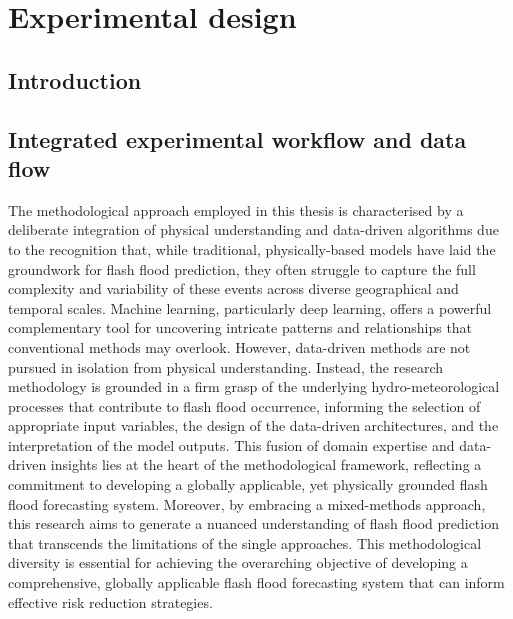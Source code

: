 \chapter{Experimental design}


\section{Introduction}






\section{Integrated experimental workflow and data flow}

The methodological approach employed in this thesis is characterised by a deliberate integration of physical understanding and data-driven algorithms due to the recognition that, while traditional, physically-based models have laid the groundwork for flash flood prediction, they often struggle to capture the full complexity and variability of these events across diverse geographical and temporal scales. Machine learning, particularly deep learning, offers a powerful complementary tool for uncovering intricate patterns and relationships that conventional methods may overlook. However, data-driven methods are not pursued in isolation from physical understanding. Instead, the research methodology is grounded in a firm grasp of the underlying hydro-meteorological processes that contribute to flash flood occurrence, informing the selection of appropriate input variables, the design of the data-driven architectures, and the interpretation of the model outputs. This fusion of domain expertise and data-driven insights lies at the heart of the methodological framework, reflecting a commitment to developing a globally applicable, yet physically grounded flash flood forecasting system. Moreover, by embracing a mixed-methods approach, this research aims to generate a nuanced understanding of flash flood prediction that transcends the limitations of the single approaches. This methodological diversity is essential for achieving the overarching objective of developing a comprehensive, globally applicable flash flood forecasting system that can inform effective risk reduction strategies. 

